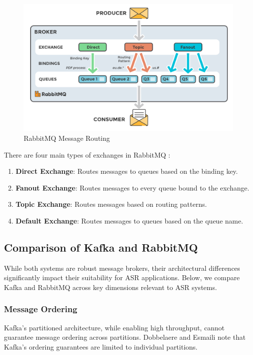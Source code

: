 \begin{figure}[H]
    \centering
    \includegraphics[width=\textwidth]{figures/exchanges-topic-fanout-direct.png}
    \caption{RabbitMQ Message Routing \cite{rabbitmq_diagram}}
    \label{fig:rabbitmq_routing}
\end{figure}

There are four main types of exchanges in RabbitMQ \cite{rabbitmq_exchanges}:
\begin{enumerate}
    \item \textbf{Direct Exchange}: Routes messages to queues based on the binding key.
    \item \textbf{Fanout Exchange}: Routes messages to every queue bound to the exchange.
    \item \textbf{Topic Exchange}: Routes messages based on routing patterns.
    \item \textbf{Default Exchange}: Routes messages to queues based on the queue name.
\end{enumerate}

\subsection{Comparison of Kafka and RabbitMQ}
While both systems are robust message brokers, their architectural differences significantly impact their suitability for ASR applications. Below, we compare Kafka and RabbitMQ across key dimensions relevant to ASR systems.

\subsubsection{Message Ordering}
Kafka's partitioned architecture, while enabling high throughput, cannot guarantee message ordering across partitions. Dobbelaere and Esmaili \cite{kafka_v_rabbitmq} note that Kafka's ordering guarantees are limited to individual partitions.

